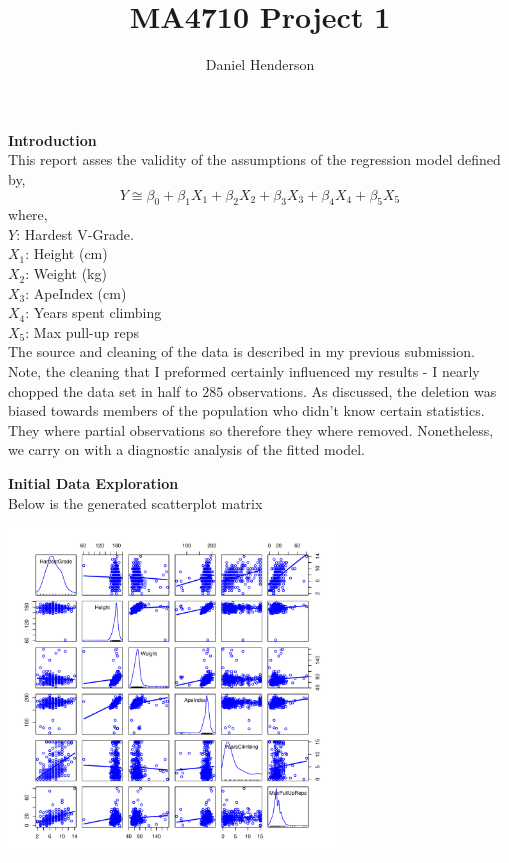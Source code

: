\documentclass[11pt]{amsart}
\title{MA4710 Project 1}
\author{Daniel Henderson}
\newcommand{\tab}{\hspace*{.75cm}}
\begin{document}
\maketitle

{\bf Introduction}\\

This report asses the validity of the assumptions of the regression model defined by,
$$ Y \cong \beta_0 + \beta_1X_1 + \beta_2 X_2 + \beta_3 X_3 + \beta_4 X_4 + \beta_5 X_5$$
where,\\
\tab $Y$: Hardest V-Grade.\\
\tab $X_1$: Height (cm)\\
\tab $X_2$: Weight (kg)\\
\tab $X_3$: ApeIndex (cm)\\
\tab $X_4$: Years spent climbing\\
\tab $X_5$: Max pull-up reps\\

The source and cleaning of the data is described in my previous submission.
Note, the cleaning that I preformed certainly influenced my results - I nearly chopped the data set in half to $285$ observations.
As discussed, the deletion was biased towards members of the population who didn't know certain statistics.
They where partial observations so therefore they where removed.
Nonetheless, we carry on with a diagnostic analysis of the fitted model.

\newpage
{\bf Initial Data Exploration}\\

Below is the generated scatterplot matrix
\begin{center}
\includegraphics[width=0.65\textwidth]{1.pdf}
\end{center}
\end{document}
